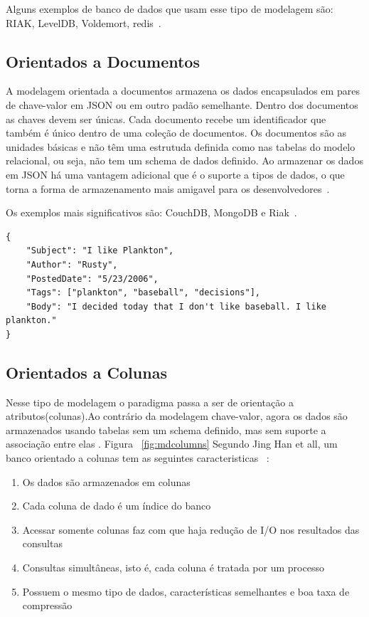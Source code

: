 Alguns exemplos de banco de dados que usam esse tipo de modelagem são: RIAK, LevelDB, Voldemort, redis~\cite{nosqldatabaseorg}.

\subsection{Orientados a Documentos}

A modelagem orientada a documentos armazena os dados encapsulados em pares de chave-valor em JSON ou em outro padão semelhante. Dentro dos documentos as chaves devem ser únicas. Cada documento recebe um identificador que também é único dentro de uma coleção de documentos. Os documentos são as unidades básicas e não têm uma estrutuda definida como nas tabelas do modelo relacional, ou seja, não tem um schema de dados definido. Ao armazenar os dados em JSON há uma vantagem adicional que é o suporte a tipos de dados, o que torna a forma de armazenamento mais amigavel para os desenvolvedores~\cite{nosqlevaluation,nosqlxrelacional}.

Os exemplos mais significativos são: CouchDB, MongoDB e Riak~\cite{nosqlevaluation}.

	\begin{lstlisting}[caption=Exemplo de arquivo do CouchDB]
{
    "Subject": "I like Plankton",
    "Author": "Rusty",
    "PostedDate": "5/23/2006",
    "Tags": ["plankton", "baseball", "decisions"],
    "Body": "I decided today that I don't like baseball. I like plankton."
}
	\end{lstlisting}

\subsection{Orientados a Colunas}

Nesse tipo de modelagem o paradigma passa a ser de orientação a atributos(colunas).Ao contrário da modelagem chave-valor, agora os dados são armazenados usando tabelas sem um schema definido, mas sem suporte a associação entre elas . Figura ~\ref{fig:mdcolumns} Segundo Jing Han et all, um banco orientado a colunas tem as seguintes caracteristicas ~\cite{surveynosql}:


\begin{enumerate}
\item{Os dados são armazenados em colunas}
\item{Cada coluna de dado é um índice do banco}
\item{Acessar somente colunas faz com que haja redução de I/O nos resultados das consultas}
\item{Consultas simultâneas, isto é, cada coluna é tratada por um processo}
\item{Possuem o mesmo tipo de dados, características semelhantes e boa taxa de compressão}
\end{enumerate}

